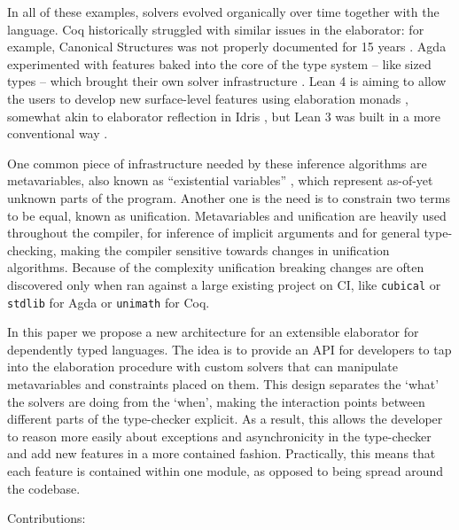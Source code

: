 \documentclass[
  sigconf,
  screen,
  review]{acmart}
\begin{document}
In all of these examples, solvers evolved organically over time together
with the language. Coq historically struggled with similar issues in the
elaborator: for example, Canonical Structures was not properly
documented for 15 years \citep{mahboubiCanonicalStructuresWorking2013}.
Agda experimented with features baked into the core of the type system
-- like sized types -- which brought their own solver infrastructure
\citep{abelExtensionMartinLofType2016}. Lean 4 is aiming to allow the
users to develop new surface-level features
\citep{leonardodemouraLeanMetaprogramming2021} using elaboration monads
\citep{mouraLeanTheoremProver2021}, somewhat akin to elaborator
reflection in Idris
\citep{christiansenElaboratorReflectionExtending2016}, but Lean 3 was
built in a more conventional way \citep{demouraLeanTheoremProver2015a}.

One common piece of infrastructure needed by these inference algorithms
are metavariables, also known as ``existential variables''
\citep[chap.~2.2.1]{thecoqdevelopmentteamCoqProofAssistant2022}, which
represent as-of-yet unknown parts of the program. Another one is the
need is to constrain two terms to be equal, known as unification.
Metavariables and unification are heavily used throughout the compiler,
for inference of implicit arguments and for general type-checking,
making the compiler sensitive towards changes in unification algorithms.
Because of the complexity unification breaking changes are often
discovered only when ran against a large existing project on CI, like
\texttt{cubical} or \texttt{stdlib} for Agda or \texttt{unimath} for
Coq.

In this paper we propose a new architecture for an extensible elaborator
for dependently typed languages. The idea is to provide an API for
developers to tap into the elaboration procedure with custom solvers
that can manipulate metavariables and constraints placed on them. This
design separates the `what' the solvers are doing from the `when',
making the interaction points between different parts of the
type-checker explicit. As a result, this allows the developer to reason
more easily about exceptions and asynchronicity in the type-checker and
add new features in a more contained fashion. Practically, this means
that each feature is contained within one module, as opposed to being
spread around the codebase.

Contributions:
\end{document}
